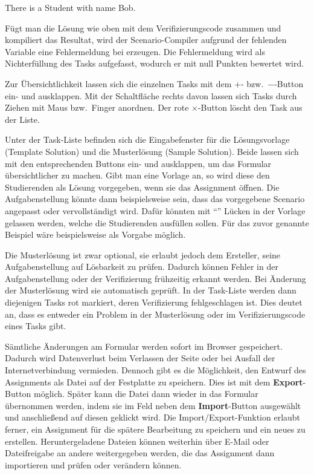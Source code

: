 \begin{mdcodeblock}
    There is a Student with name Bob.
\end{mdcodeblock}

Fügt man die Lösung wie oben mit dem Verifizierungscode zusammen und kompiliert das Resultat, wird der Scenario-Compiler aufgrund der fehlenden Variable  eine Fehlermeldung bei  erzeugen.
Die Fehlermeldung wird als Nichterfüllung des Tasks aufgefasst, wodurch er mit null Punkten bewertet wird.

Zur Übersichtlichkeit lassen sich die einzelnen Tasks mit dem \textbf{$+$}- bzw.\ \textbf{$-$}-Button ein- und ausklappen.
Mit der Schaltfläche rechts davon lassen sich Tasks durch Ziehen mit Maus bzw.\ Finger anordnen.
Der rote \textbf{$\times$}-Button löscht den Task aus der Liste.

Unter der Task-Liste befinden sich die Eingabefenster für die Lösungsvorlage (Template Solution) und die Musterlösung (Sample Solution).
Beide lassen sich mit den entsprechenden Buttons ein- und ausklappen, um das Formular übersichtlicher zu machen.
Gibt man eine Vorlage an, so wird diese den Studierenden als Lösung vorgegeben, wenn sie das Assignment öffnen.
Die Aufgabenstellung könnte dann beispielsweise sein, dass das vorgegebene Scenario angepasst oder vervollständigt wird.
Dafür könnten mit ``'' Lücken in der Vorlage gelassen werden, welche die Studierenden ausfüllen sollen.
Für das zuvor genannte Beispiel wäre beispielsweise  als Vorgabe möglich.

Die Musterlösung ist zwar optional, sie erlaubt jedoch dem Ersteller, seine Aufgabenstellung auf Lösbarkeit zu prüfen.
Dadurch können Fehler in der Aufgabenstellung oder der Verifizierung frühzeitig erkannt werden.
Bei Änderung der Musterlösung wird sie automatisch geprüft.
In der Task-Liste werden dann diejenigen Tasks rot markiert, deren Verifizierung fehlgeschlagen ist.
Dies deutet an, dass es entweder ein Problem in der Musterlösung oder im Verifizierungscode eines Tasks gibt.

Sämtliche Änderungen am Formular werden sofort im Browser gespeichert.
Dadurch wird Datenverlust beim Verlassen der Seite oder bei Ausfall der Internetverbindung vermieden.
Dennoch gibt es die Möglichkeit, den Entwurf des Assignments als Datei auf der Festplatte zu speichern.
Dies ist mit dem \textbf{Export}-Button möglich.
Später kann die Datei dann wieder in das Formular übernommen werden, indem sie im Feld neben dem \textbf{Import}-Button ausgewählt und anschließend auf diesen geklickt wird.
Die Import/Export-Funktion erlaubt ferner, ein Assignment für die spätere Bearbeitung zu speichern und ein neues zu erstellen.
Heruntergeladene Dateien können weiterhin über E-Mail oder Dateifreigabe an andere weitergegeben werden, die das Assignment dann importieren und prüfen oder verändern können.

